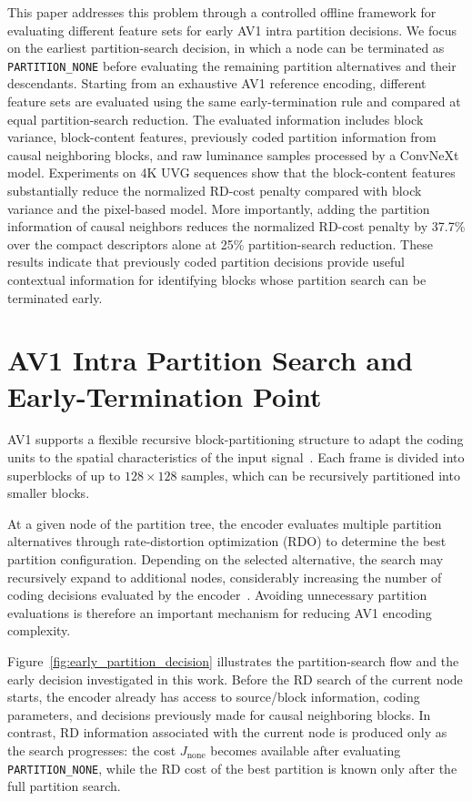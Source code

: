 \documentclass{article}
\begin{document}
This paper addresses this problem through a controlled offline framework for evaluating different feature sets for early AV1 intra partition decisions. We focus on the earliest partition-search decision, in which a node can be terminated as \texttt{PARTITION\_NONE} before evaluating the remaining partition alternatives and their descendants. Starting from an exhaustive AV1 reference encoding, different feature sets are evaluated using the same early-termination rule and compared at equal partition-search reduction. The evaluated information includes block variance, block-content features, previously coded partition information from causal neighboring blocks, and raw luminance samples processed by a ConvNeXt model. Experiments on 4K UVG sequences show that the block-content features substantially reduce the normalized RD-cost penalty compared with block variance and the pixel-based model. More importantly, adding the partition information of causal neighbors reduces the normalized RD-cost penalty by 37.7\% over the compact descriptors alone at 25\% partition-search reduction. These results indicate that previously coded partition decisions provide useful contextual information for identifying blocks whose partition search can be terminated early.

\section{AV1 Intra Partition Search and Early-Termination Point}

AV1 supports a flexible recursive block-partitioning structure to adapt the coding units to the spatial characteristics of the input signal~\cite{han2021av1overview,chen2018av1tools}. Each frame is divided into superblocks of up to $128\times128$ samples, which can be recursively partitioned into smaller blocks.

At a given node of the partition tree, the encoder evaluates multiple partition alternatives through rate-distortion optimization (RDO) to determine the best partition configuration. Depending on the selected alternative, the search may recursively expand to additional nodes, considerably increasing the number of coding decisions evaluated by the encoder~\cite{bender2023av1complexity}. Avoiding unnecessary partition evaluations is therefore an important mechanism for reducing AV1 encoding complexity.

Figure~\ref{fig:early_partition_decision} illustrates the partition-search flow and the early decision investigated in this work. Before the RD search of the current node starts, the encoder already has access to source/block information, coding parameters, and decisions previously made for causal neighboring blocks. In contrast, RD information associated with the current node is produced only as the search progresses: the cost $J_{\mathrm{none}}$ becomes available after evaluating \texttt{PARTITION\_NONE}, while the RD cost of the best partition is known only after the full partition search.
\end{document}
